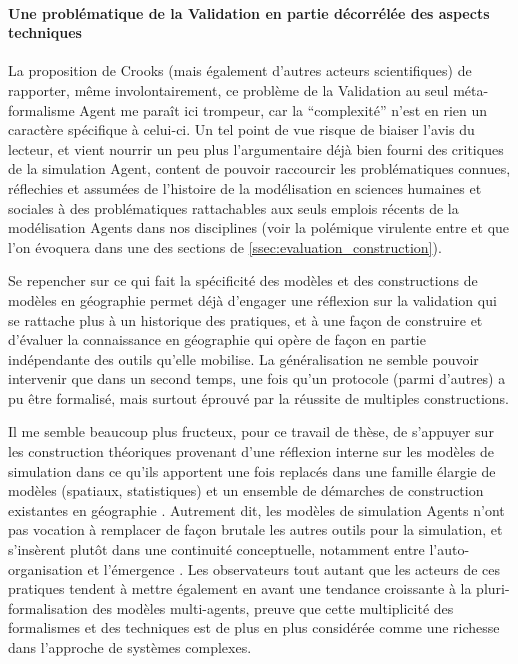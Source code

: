 \paragraph{Une problématique de la Validation en partie décorrélée des aspects techniques}
\label{decorreler_validation}

La proposition de Crooks (mais également d'autres acteurs scientifiques) de rapporter, même involontairement, ce problème de la Validation au seul méta-formalisme Agent me paraît ici trompeur, car la \enquote{complexité} n'est en rien un caractère spécifique à celui-ci. Un tel point de vue risque de biaiser l'avis du lecteur, et vient nourrir un peu plus l'argumentaire déjà bien fourni des critiques de la simulation Agent, content de pouvoir raccourcir les problématiques connues, réflechies et assumées de l'histoire de la modélisation en sciences humaines et sociales à des problématiques rattachables aux seuls emplois récents de la modélisation Agents dans nos disciplines (voir la polémique virulente entre \textcite{Yanoff2008} et \textcites{Elsenbroich2012,Chattoe2011} que l'on évoquera dans une des sections de \ref{ssec:evaluation_construction}).

Se repencher sur ce qui fait la spécificité des modèles et des constructions de modèles en géographie permet déjà d'engager une réflexion sur la validation qui se rattache plus à un historique des pratiques, et à une façon de construire et d'évaluer la connaissance en géographie qui opère de façon en partie indépendante des outils qu'elle mobilise. La généralisation ne semble pouvoir intervenir que dans un second temps, une fois qu'un protocole (parmi d'autres) a pu être formalisé, mais surtout éprouvé par la réussite de multiples constructions. %

Il me semble beaucoup plus fructeux, pour ce travail de thèse, de s'appuyer sur les construction théoriques provenant d'une réflexion interne sur les modèles de simulation dans ce qu'ils apportent une fois replacés dans une famille élargie de modèles (spatiaux, statistiques) et un ensemble de démarches de construction existantes en géographie \autocites{Geopoint2000, Mathian2014, Sanders2007}. Autrement dit, les modèles de simulation Agents n'ont pas vocation à remplacer de façon brutale les autres outils pour la simulation, et s'insèrent plutôt dans une continuité conceptuelle, notamment entre l'auto-organisation et l'émergence \autocites{Pumain2013}[851]{Sanders2013}. Les observateurs \autocites{Varenne2008b,Varenne2012a} tout autant que les acteurs \autocite{Sanders2013} de ces pratiques tendent à mettre également en avant une tendance croissante à la pluri-formalisation des modèles multi-agents, preuve que cette multiplicité des formalismes et des techniques est de plus en plus considérée comme une richesse dans l'approche de systèmes complexes.

